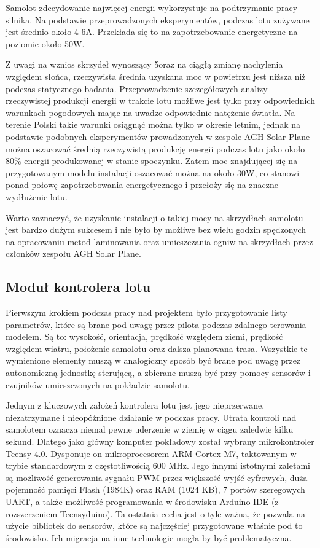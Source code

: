\documentclass[12pt, a4paper]{article}
\begin{document}
Samolot zdecydowanie najwięcej energii wykorzystuje na podtrzymanie pracy silnika. Na podstawie przeprowadzonych eksperymentów, podczas lotu zużywane jest średnio około 4-6A. Przekłada się to na zapotrzebowanie energetyczne na poziomie około 50W. 

Z uwagi na wznios skrzydeł wynoszący 5\textdegree oraz na ciągłą zmianę nachylenia względem słońca, rzeczywista średnia uzyskana moc w powietrzu jest niższa niż podczas statycznego badania. Przeprowadzenie szczegółowych analizy rzeczywistej produkcji energii w trakcie lotu możliwe jest tylko przy odpowiednich warunkach pogodowych mając na uwadze odpowiednie natężenie światła. Na terenie Polski takie warunki osiągnąć można tylko w okresie letnim, jednak na podstawie podobnych eksperymentów prowadzonych w zespole AGH Solar Plane można oszacować średnią rzeczywistą produkcję energii podczas lotu jako około 80\% energii produkowanej w stanie spoczynku. Zatem moc znajdującej się na przygotowanym modelu instalacji oszacować można na około 30W, co stanowi ponad połowę zapotrzebowania energetycznego i przełoży się na znaczne wydłużenie lotu.

Warto zaznaczyć, że uzyskanie instalacji o takiej mocy na skrzydłach samolotu jest bardzo dużym sukcesem i nie było by możliwe bez wielu godzin spędzonych na opracowaniu metod laminowania oraz umieszczania ogniw na skrzydłach przez członków zespołu AGH Solar Plane.

\FloatBarrier
\subsection{Moduł kontrolera lotu}
Pierwszym krokiem podczas pracy nad projektem  było przygotowanie listy parametrów, które są brane pod uwagę przez pilota podczas zdalnego terowania modelem. Są to: wysokość, orientacja, prędkość względem ziemi, prędkość względem wiatru, położenie samolotu oraz dalsza planowana trasa. Wszystkie te wymienione elementy muszą w analogiczny sposób być brane pod uwagę przez autonomiczną jednostkę sterującą, a zbierane muszą być przy pomocy sensorów i czujników umieszczonych na pokładzie samolotu. 

Jednym z kluczowych założeń kontrolera lotu jest jego nieprzerwane, niezatrzymane i nieopóźnione działanie w podczas pracy. Utrata kontroli nad samolotem oznacza niemal pewne uderzenie w ziemię w ciągu zaledwie kilku sekund. Dlatego jako główny komputer pokładowy został wybrany mikrokontroler Teensy 4.0. Dysponuje on mikroprocesorem ARM Cortex-M7, taktowanym w trybie standardowym z częstotliwością 600 MHz. Jego innymi istotnymi zaletami są możliwość generowania sygnału PWM przez większość wyjść cyfrowych, duża pojemność pamięci Flash (1984K) oraz RAM (1024 KB), 7 portów szeregowych UART, a także możliwość programowania w środowisku Arduino IDE (z rozszerzeniem Teensyduino). Ta ostatnia cecha jest o tyle ważna, że pozwala na użycie bibliotek do sensorów, które są najczęściej przygotowane właśnie pod to środowisko. Ich migracja na inne technologie mogła by być problematyczna. 
\end{document}
